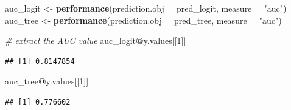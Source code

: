 \documentclass[]{article}
\newenvironment{Shaded}{\begin{snugshade}}{\end{snugshade}}
\newcommand{\KeywordTok}[1]{\textcolor[rgb]{0.13,0.29,0.53}{\textbf{#1}}}
\newcommand{\DataTypeTok}[1]{\textcolor[rgb]{0.13,0.29,0.53}{#1}}
\newcommand{\DecValTok}[1]{\textcolor[rgb]{0.00,0.00,0.81}{#1}}
\newcommand{\FloatTok}[1]{\textcolor[rgb]{0.00,0.00,0.81}{#1}}
\newcommand{\StringTok}[1]{\textcolor[rgb]{0.31,0.60,0.02}{#1}}
\newcommand{\CommentTok}[1]{\textcolor[rgb]{0.56,0.35,0.01}{\textit{#1}}}
\newcommand{\OperatorTok}[1]{\textcolor[rgb]{0.81,0.36,0.00}{\textbf{#1}}}
\newcommand{\NormalTok}[1]{#1}
\begin{document}
\begin{Shaded}
\begin{Highlighting}[]
\NormalTok{auc_logit <-}\StringTok{ }\KeywordTok{performance}\NormalTok{(}\DataTypeTok{prediction.obj =}\NormalTok{ pred_logit, }\DataTypeTok{measure =} \StringTok{"auc"}\NormalTok{)}
\NormalTok{auc_tree <-}\StringTok{ }\KeywordTok{performance}\NormalTok{(}\DataTypeTok{prediction.obj =}\NormalTok{ pred_tree, }\DataTypeTok{measure =} \StringTok{"auc"}\NormalTok{)}

\CommentTok{# extract the AUC value}
\NormalTok{auc_logit}\OperatorTok{@}\NormalTok{y.values[[}\DecValTok{1}\NormalTok{]]}
\end{Highlighting}
\end{Shaded}

\begin{verbatim}
## [1] 0.8147854
\end{verbatim}

\begin{Shaded}
\begin{Highlighting}[]
\NormalTok{auc_tree}\OperatorTok{@}\NormalTok{y.values[[}\DecValTok{1}\NormalTok{]]}
\end{Highlighting}
\end{Shaded}

\begin{verbatim}
## [1] 0.776602
\end{verbatim}

\begin{Shaded}
\end{Shaded}
\end{document}
